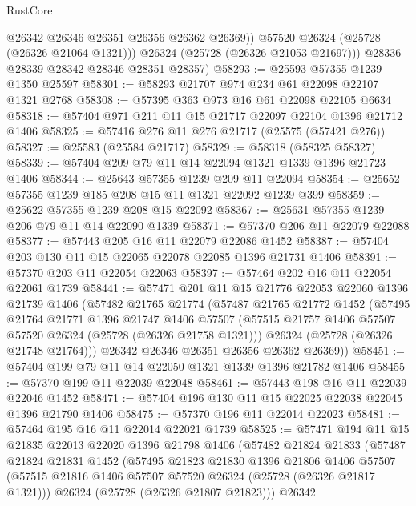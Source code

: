 \begin{lexlean}{RustCore}
\begin{coremodule}
              @26342
              @26346
              @26351
              @26356
              @26362
              @26369))
          @57520
          @26324
          (@25728 (@26326 @21064 @1321)))
        @26324
        (@25728 (@26326 @21053 @21697)))
      @28336
      @28339
      @28342
      @28346
      @28351
      @28357)
@58293 := @25593 @57355 @1239 @1350 @25597
@58301 := @58293 @21707 @974 @234 @61 @22098 @22107 @1321 @2768
@58308 := @57395 @363 @973 @16 @61 @22098 @22105 @6634
@58318 := @57404 @971 @211 @11 @15 @21717 @22097 @22104 @1396 @21712 @1406
@58325 := @57416 @276 @11 @276 @21717 (@25575 (@57421 @276))
@58327 := @25583 (@25584 @21717)
@58329 := @58318 (@58325 @58327)
@58339 := @57404 @209 @79 @11 @14 @22094 @1321 @1339 @1396 @21723 @1406
@58344 := @25643 @57355 @1239 @209 @11 @22094
@58354 := @25652 @57355 @1239 @185 @208 @15 @11 @1321 @22092 @1239 @399
@58359 := @25622 @57355 @1239 @208 @15 @22092
@58367 := @25631 @57355 @1239 @206 @79 @11 @14 @22090 @1339
@58371 := @57370 @206 @11 @22079 @22088
@58377 := @57443 @205 @16 @11 @22079 @22086 @1452
@58387 := @57404 @203 @130 @11 @15 @22065 @22078 @22085 @1396 @21731 @1406
@58391 := @57370 @203 @11 @22054 @22063
@58397 := @57464 @202 @16 @11 @22054 @22061 @1739
@58441 := @57471
    @201
    @11
    @15
    @21776
    @22053
    @22060
    @1396
    @21739
    @1406
    (@57482
      @21765
      @21774
      (@57487
        @21765
        @21772
        @1452
        (@57495
          @21764
          @21771
          @1396
          @21747
          @1406
          @57507
          (@57515 @21757 @1406 @57507 @57520 @26324 (@25728 (@26326 @21758 @1321)))
          @26324
          (@25728 (@26326 @21748 @21764)))
        @26342
        @26346
        @26351
        @26356
        @26362
        @26369))
@58451 := @57404 @199 @79 @11 @14 @22050 @1321 @1339 @1396 @21782 @1406
@58455 := @57370 @199 @11 @22039 @22048
@58461 := @57443 @198 @16 @11 @22039 @22046 @1452
@58471 := @57404 @196 @130 @11 @15 @22025 @22038 @22045 @1396 @21790 @1406
@58475 := @57370 @196 @11 @22014 @22023
@58481 := @57464 @195 @16 @11 @22014 @22021 @1739
@58525 := @57471
    @194
    @11
    @15
    @21835
    @22013
    @22020
    @1396
    @21798
    @1406
    (@57482
      @21824
      @21833
      (@57487
        @21824
        @21831
        @1452
        (@57495
          @21823
          @21830
          @1396
          @21806
          @1406
          @57507
          (@57515 @21816 @1406 @57507 @57520 @26324 (@25728 (@26326 @21817 @1321)))
          @26324
          (@25728 (@26326 @21807 @21823)))
        @26342

\end{coremodule}
\end{lexlean}

